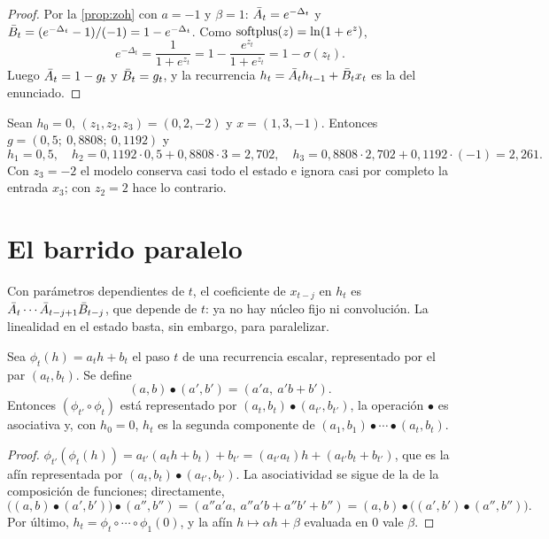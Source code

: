 \begin{proof}
Por la \cref{prop:zoh} con $a=-1$ y $\beta=1$: $\bar{A}_t=e^{-\Delta_t}$ y $\bar{B}_t=(e^{-\Delta_t}-1)/(-1)=1-e^{-\Delta_t}$. Como $\operatorname{softplus}(z)=\ln(1+e^{z})$,
\[
e^{-\Delta_t}=\frac{1}{1+e^{z_t}}=1-\frac{e^{z_t}}{1+e^{z_t}}=1-\sigma(z_t).
\]
Luego $\bar{A}_t=1-g_t$ y $\bar{B}_t=g_t$, y la recurrencia $h_t=\bar{A}_th_{t-1}+\bar{B}_tx_t$ es la del enunciado.
\end{proof}

\begin{ejemplo}\label{ej:puerta}
Sean $h_0=0$, $(z_1,z_2,z_3)=(0,2,-2)$ y $x=(1,3,-1)$. Entonces $g=(0{,}5;\ 0{,}8808;\ 0{,}1192)$ y
\[
h_1=0{,}5,\quad h_2=0{,}1192\cdot 0{,}5+0{,}8808\cdot 3=2{,}702,\quad h_3=0{,}8808\cdot 2{,}702+0{,}1192\cdot(-1)=2{,}261.
\]
Con $z_3=-2$ el modelo conserva casi todo el estado e ignora casi por completo la entrada $x_3$; con $z_2=2$ hace lo contrario.
\end{ejemplo}

\section{El barrido paralelo}

Con parámetros dependientes de $t$, el coeficiente de $x_{t-j}$ en $h_t$ es $\bar{A}_t\cdots\bar{A}_{t-j+1}\bar{B}_{t-j}$, que depende de $t$: ya no hay núcleo fijo ni convolución. La linealidad en el estado basta, sin embargo, para paralelizar.

\begin{proposicion}\label{prop:scan}
Sea $\phi_t(h)=a_th+b_t$ el paso $t$ de una recurrencia escalar, representado por el par $(a_t,b_t)$. Se define
\[
(a,b)\bullet(a',b')=(a'a,\ a'b+b').
\]
Entonces $(\phi_{t'}\circ\phi_t)$ está representado por $(a_t,b_t)\bullet(a_{t'},b_{t'})$, la operación $\bullet$ es asociativa y, con $h_0=0$, $h_t$ es la segunda componente de $(a_1,b_1)\bullet\cdots\bullet(a_t,b_t)$.
\end{proposicion}

\begin{proof}
$\phi_{t'}(\phi_t(h))=a_{t'}(a_th+b_t)+b_{t'}=(a_{t'}a_t)h+(a_{t'}b_t+b_{t'})$, que es la afín representada por $(a_t,b_t)\bullet(a_{t'},b_{t'})$. La asociatividad se sigue de la de la composición de funciones; directamente,
\[
\bigl((a,b)\bullet(a',b')\bigr)\bullet(a'',b'')=(a''a'a,\ a''a'b+a''b'+b'')=(a,b)\bullet\bigl((a',b')\bullet(a'',b'')\bigr).
\]
Por último, $h_t=\phi_t\circ\cdots\circ\phi_1(0)$, y la afín $h\mapsto\alpha h+\beta$ evaluada en $0$ vale $\beta$.
\end{proof}

